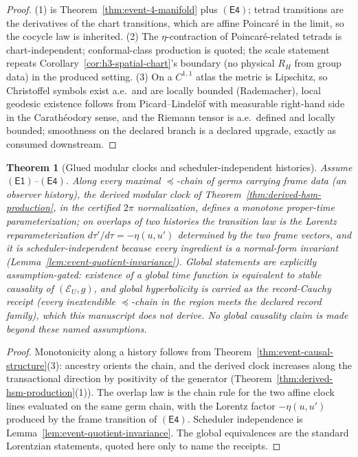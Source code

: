 \documentclass[11pt]{article}
\newtheorem{theorem}{Theorem}[section]
\begin{document}
\begin{proof}
(1) is Theorem~\ref{thm:event-4-manifold} plus \(\mathsf{(E4)}\); tetrad
transitions are the derivatives of the chart transitions, which are affine
Poincar\'e in the limit, so the cocycle law is inherited. (2) The
\(\eta\)-contraction of Poincar\'e-related tetrads is chart-independent;
conformal-class production is quoted; the scale statement repeats
Corollary~\ref{cor:h3-spatial-chart}'s boundary (no physical \(R_H\) from
group data) in the produced setting. (3) On a \(C^{1,1}\) atlas the metric is
Lipschitz, so Christoffel symbols exist a.e.\ and are locally bounded
(Rademacher), local geodesic existence follows from Picard--Lindel\"of with
measurable right-hand side in the Carath\'eodory sense, and the Riemann tensor
is a.e.\ defined and locally bounded; smoothness on the declared branch is a
declared upgrade, exactly as consumed downstream.
\end{proof}

\begin{theorem}[Glued modular clocks and scheduler-independent histories]
\label{thm:clock-gluing}
Assume \(\mathsf{(E1)}\)--\(\mathsf{(E4)}\). Along every maximal
\(\preceq\)-chain of germs carrying frame data (an observer history), the
derived modular clock of Theorem~\ref{thm:derived-hsm-production}, in the
certified \(2\pi\) normalization, defines a monotone proper-time
parameterization; on overlaps of two histories the transition law is the
Lorentz reparameterization
\(d\tau'/d\tau=-\eta(u,u')\) determined by the two frame vectors, and it is
scheduler-independent because every ingredient is a normal-form invariant
(Lemma~\ref{lem:event-quotient-invariance}). Global statements are explicitly
assumption-gated: existence of a global time function is equivalent to stable
causality of \((\mathcal E_U,g)\), and global hyperbolicity is carried as the
\emph{record-Cauchy receipt} (every inextendible \(\preceq\)-chain in the
region meets the declared record family), which this manuscript does not
derive. No global causality claim is made beyond these named assumptions.
\end{theorem}

\begin{proof}
Monotonicity along a history follows from
Theorem~\ref{thm:event-causal-structure}(3): ancestry orients the chain, and
the derived clock increases along the transactional direction by positivity
of the generator (Theorem~\ref{thm:derived-hsm-production}(1)). The overlap
law is the chain rule for the two affine clock lines evaluated on the same
germ chain, with the Lorentz factor \(-\eta(u,u')\) produced by the frame
transition of \(\mathsf{(E4)}\). Scheduler independence is
Lemma~\ref{lem:event-quotient-invariance}. The global equivalences are the
standard Lorentzian statements, quoted here only to name the receipts.
\end{proof}
\end{document}
